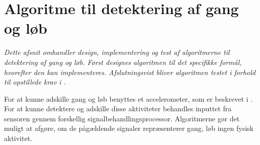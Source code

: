 \section{Algoritme til detektering af gang og løb}\label{sec:algogangloeb}
\textit{Dette afsnit omhandler design, implementering og test af algoritmerne til detektering af gang og løb. Først designes algoritmen til det specifikke formål, hvorefter den kan implementeres. Afslutningsvist bliver algoritmen testet i forhold til opstillede krav i .} 

For at kunne adskille gang og løb benyttes et accelerometer, som er beskrevet i . For at kunne detektere og adskille disse aktiviteter behandles inputtet fra sensoren gennem forskellig signalbehandlingsprocessor. Algoritmerne gør det muligt at afgøre, om de pågældende signaler repræsenterer gang, løb ingen fysisk aktivitet. 

